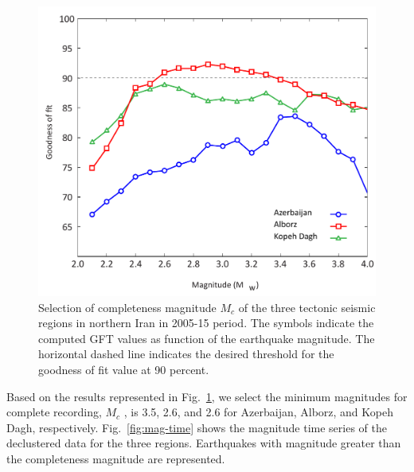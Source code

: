 \begin{figure} [ht]
\centering
\includegraphics[scale=0.4]{figures/pdf/Figure04.pdf} 
\caption{ Selection of completeness magnitude $M_c$ of the three tectonic seismic regions in northern Iran in 2005-15 period. The symbols indicate the computed GFT values as function of the earthquake magnitude. The horizontal dashed line indicates the desired threshold for the goodness of fit value at 90 percent.}
\label{fig:completeness}
\end{figure} 
\noindent
Based on the results represented in Fig.~\ref{fig:completeness}, we select the minimum magnitudes for complete recording,  $M_c$ , is 3.5, 2.6, and 2.6 for Azerbaijan, Alborz, and Kopeh Dagh, respectively. Fig.~\ref{fig:mag-time}  shows the magnitude time series of the declustered data for the three regions. Earthquakes with magnitude greater than the completeness magnitude are represented. 

